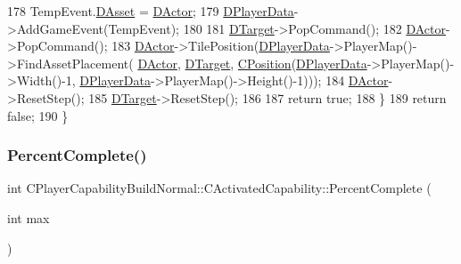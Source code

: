 \begin{DoxyCode}
178         TempEvent.\hyperlink{structSGameEvent_a40c85eeac83b96887b7449c9bdc5d624}{DAsset} = \hyperlink{classCActivatedPlayerCapability_a54ca944b47bff2718330639941d402b0}{DActor};
179         \hyperlink{classCActivatedPlayerCapability_a9bf27c322a73f4b11c8183cc1973c3d8}{DPlayerData}->AddGameEvent(TempEvent);
180         
181         \hyperlink{classCActivatedPlayerCapability_a8a1cf50b6501bcfd55af0c935828e395}{DTarget}->PopCommand();
182         \hyperlink{classCActivatedPlayerCapability_a54ca944b47bff2718330639941d402b0}{DActor}->PopCommand();
183         \hyperlink{classCActivatedPlayerCapability_a54ca944b47bff2718330639941d402b0}{DActor}->TilePosition(\hyperlink{classCActivatedPlayerCapability_a9bf27c322a73f4b11c8183cc1973c3d8}{DPlayerData}->PlayerMap()->FindAssetPlacement(
      \hyperlink{classCActivatedPlayerCapability_a54ca944b47bff2718330639941d402b0}{DActor}, \hyperlink{classCActivatedPlayerCapability_a8a1cf50b6501bcfd55af0c935828e395}{DTarget}, \hyperlink{classCPosition}{CPosition}(\hyperlink{classCActivatedPlayerCapability_a9bf27c322a73f4b11c8183cc1973c3d8}{DPlayerData}->PlayerMap()->Width()-1, 
      \hyperlink{classCActivatedPlayerCapability_a9bf27c322a73f4b11c8183cc1973c3d8}{DPlayerData}->PlayerMap()->Height()-1)));
184         \hyperlink{classCActivatedPlayerCapability_a54ca944b47bff2718330639941d402b0}{DActor}->ResetStep();
185         \hyperlink{classCActivatedPlayerCapability_a8a1cf50b6501bcfd55af0c935828e395}{DTarget}->ResetStep();
186         
187         \textcolor{keywordflow}{return} \textcolor{keyword}{true};    
188     \}
189     \textcolor{keywordflow}{return} \textcolor{keyword}{false};
190 \}
\end{DoxyCode}
\hypertarget{classCPlayerCapabilityBuildNormal_1_1CActivatedCapability_a40bf27f9dfe88ad17a51ebb12c078568}{}\label{classCPlayerCapabilityBuildNormal_1_1CActivatedCapability_a40bf27f9dfe88ad17a51ebb12c078568} 
\subsubsection{\texorpdfstring{Percent\+Complete()}{PercentComplete()}}
{\footnotesize\ttfamily int C\+Player\+Capability\+Build\+Normal\+::\+C\+Activated\+Capability\+::\+Percent\+Complete (\begin{DoxyParamCaption}\item[{int}]{max }\end{DoxyParamCaption})\hspace{0.3cm}{\ttfamily [virtual]}}



